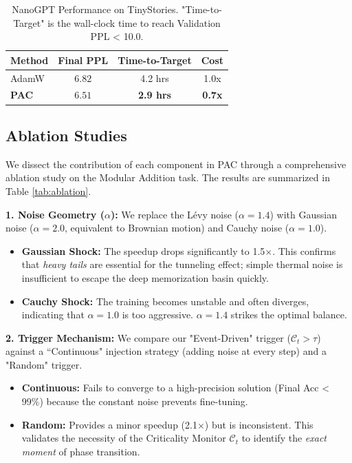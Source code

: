 \documentclass{article}
\theoremstyle{plain}
\theoremstyle{definition}
\theoremstyle{remark}
\newcommand{\C}{\mathcal{C}} %
\begin{document}
\begin{table}[h]
\caption{NanoGPT Performance on TinyStories. "Time-to-Target" is the wall-clock time to reach Validation PPL < 10.0.}
\label{tab:nanogpt}
\begin{center}
\begin{small}
\begin{sc}
\begin{tabular}{lccc}
\toprule
Method & Final PPL & Time-to-Target & Cost \\
\midrule
AdamW & $6.82$ & 4.2 hrs & 1.0x \\
\textbf{PAC} & $\mathbf{6.51}$ & \textbf{2.9 hrs} & \textbf{0.7x} \\
\bottomrule
\end{tabular}
\end{sc}
\end{small}
\end{center}
\end{table}

\subsection{Ablation Studies}
\label{subsec:ablation}

We dissect the contribution of each component in PAC through a comprehensive ablation study on the Modular Addition task. The results are summarized in Table \ref{tab:ablation}.

\textbf{1. Noise Geometry ($\alpha$):} 
We replace the Lévy noise ($\alpha=1.4$) with Gaussian noise ($\alpha=2.0$, equivalent to Brownian motion) and Cauchy noise ($\alpha=1.0$). 
\begin{itemize}
    \item \textbf{Gaussian Shock:} The speedup drops significantly to 1.5$\times$. This confirms that \textit{heavy tails} are essential for the tunneling effect; simple thermal noise is insufficient to escape the deep memorization basin quickly.
    \item \textbf{Cauchy Shock:} The training becomes unstable and often diverges, indicating that $\alpha=1.0$ is too aggressive. $\alpha=1.4$ strikes the optimal balance.
\end{itemize}

\textbf{2. Trigger Mechanism:} 
We compare our "Event-Driven" trigger ($\C_t > \tau$) against a ``Continuous" injection strategy (adding noise at every step) and a "Random" trigger.
\begin{itemize}
    \item \textbf{Continuous:} Fails to converge to a high-precision solution (Final Acc < 99\%) because the constant noise prevents fine-tuning.
    \item \textbf{Random:} Provides a minor speedup (2.1$\times$) but is inconsistent. This validates the necessity of the Criticality Monitor $\C_t$ to identify the \textit{exact moment} of phase transition.
\end{itemize}
\end{document}
